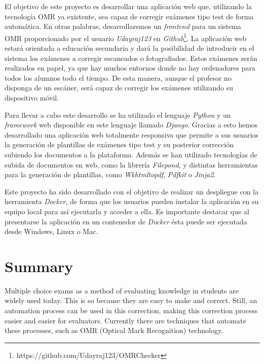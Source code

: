 \documentclass[a4paper, 12pt]{book}
\begin{document}
El objetivo de este proyecto es desarrollar una aplicación
web que, utilizando la tecnología OMR ya existente,
sea capaz de corregir exámenes tipo
test de forma automática. En otras palabras, desarrollaremos un \textit{frontend}
para un sistema OMR proporcionado por el usuario \textit{Udayraj123} en
\textit{Github}\footnote{https://github.com/Udayraj123/OMRChecker}.
La aplicación web estará orientada a educación secundaria y
dará la posibilidad de
introducir en el sistema los exámenes a corregir escaneados o
fotografiados. Estos exámenes serán realizados en papel, ya que hay muchos
entornos donde no hay ordenadores para
todos los alumnos todo el tiempo. De esta manera, aunque el profesor
no disponga de un escáner, será capaz de corregir los exámenes utilizando
su dispositivo móvil.

Para llevar a cabo este desarrollo se ha utilizado el lenguaje \textit{Python}
y un \textit{framework} web disponible en este lenguaje llamado \textit{Django}. 
Gracias
a esto hemos desarrollado una aplicación web totalmente responsiva que
permite a sus usuarios la generación de plantillas de exámenes tipo
test y su posterior corrección subiendo los documentos a la plataforma.
Además se han utilizado tecnologías de subida de documentos en web,
como la librería \textit{Filepond}, y distintas herramientas para 
la generación de plantillas, como \textit{Wkhtmltopdf}, \textit{Pdfkit} o \textit{Jinja2}.

Este proyecto ha sido desarrollado con el objetivo de realizar
un despliegue con la herramienta
\textit{Docker}, de forma que los usuarios pueden instalar la aplicación
en su equipo local para así ejecutarla y acceder a ella. Es importante destacar
que al presentarse la aplicación en un contenedor de \textit{Docker} ésta puede
ser ejecutada desde Windows, Linux o Mac.


\chapter*{Summary}

Multiple choice exams as a method of evaluating knowledge in
students are widely used today. This is so because they are easy
to make and correct. Still, an automation process can be used in
this correction, making this correction process easier and easier
for evaluators. Currently there are techniques that automate these
processes, such as OMR (Optical Mark Recognition) technology.
\end{document}
